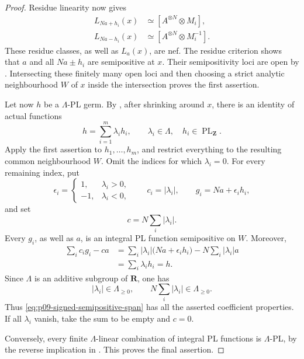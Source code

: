\begin{proof}
Residue linearity \cite[Lemma~6.18]{GJR26} now gives
\[
 \begin{aligned}
 L_{Na+h_i}(x)
   &\simeq [A^{\otimes N}\otimes M_i],\\
 L_{Na-h_i}(x)
   &\simeq [A^{\otimes N}\otimes M_i^{-1}].
 \end{aligned}
\]
These residue classes, as well as \(L_a(x)\), are nef.  The residue
criterion \cite[Proposition~7.1]{GJR26} shows that \(a\) and all
\(Na\pm h_i\) are semipositive at \(x\).  Their semipositivity loci are
open by \cite[Remark~7.3(4)]{GJR26}.  Intersecting these finitely many
open loci and then choosing a strict analytic neighbourhood \(W\) of
\(x\) inside the intersection proves the first assertion.

Let now \(h\) be a \(\Lambda\)-PL germ.  By
\cite[Proposition~5.8]{GJR26}, after shrinking around \(x\), there is an
identity of actual functions
\[
                              h=\sum_{i=1}^{m}\lambda_i h_i,
 \qquad
 \lambda_i\in\Lambda,\quad
 h_i\in\operatorname{PL}_{\mathbf Z}.
\]
Apply the first assertion to \(h_1,\ldots,h_m\), and restrict everything
to the resulting common neighbourhood \(W\).  Omit the indices for
which \(\lambda_i=0\).  For every remaining index, put
\[
 \epsilon_i=
 \begin{cases}
  1,&\lambda_i>0,\\
 -1,&\lambda_i<0,
 \end{cases}
 \qquad
 c_i=|\lambda_i|,
 \qquad
 g_i=Na+\epsilon_i h_i,
\]
and set
\[
                              c=N\sum_i|\lambda_i|.
\]
Every \(g_i\), as well as \(a\), is an integral PL function semipositive
on \(W\).  Moreover,
\[
 \begin{aligned}
 \sum_i c_ig_i-ca
 &=\sum_i|\lambda_i|
       \bigl(Na+\epsilon_i h_i\bigr)
       -N\sum_i|\lambda_i|a\\
 &=\sum_i\lambda_i h_i
 =h.
 \end{aligned}
\]
Since \(\Lambda\) is an additive subgroup of \(\mathbf R\), one has
\[
                 |\lambda_i|\in\Lambda_{\geq0},
 \qquad
                 N\sum_i|\lambda_i|\in\Lambda_{\geq0}.
\]
Thus \eqref{eq:p09-signed-semipositive-span} has all the asserted
coefficient properties.  If all \(\lambda_i\) vanish, take the sum to
be empty and \(c=0\).

Conversely, every finite \(\Lambda\)-linear combination of integral PL
functions is \(\Lambda\)-PL, by the reverse implication in
\cite[Proposition~5.8]{GJR26}.  This proves the final assertion.
\end{proof}

